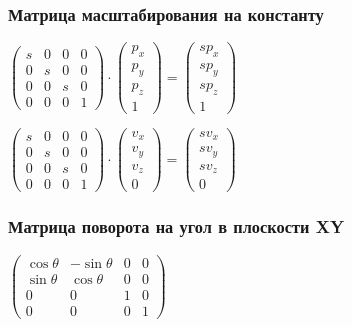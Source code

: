 \documentclass{beamer}
\begin{document}
\begin{frame}[fragile]
\frametitle{Матрица масштабирования на константу}
\begin{center}
\begin{math}
\begin{pmatrix}
s & 0 & 0 & 0 \\
0 & s & 0 & 0 \\
0 & 0 & s & 0 \\
0 & 0 & 0 & 1
\end{pmatrix}
\cdot
\begin{pmatrix}
p_x \\
p_y \\
p_z \\
1
\end{pmatrix}
=
\begin{pmatrix}
s p_x\\
s p_y\\
s p_z\\
1
\end{pmatrix}
\end{math}

\begin{math}
\begin{pmatrix}
s & 0 & 0 & 0 \\
0 & s & 0 & 0 \\
0 & 0 & s & 0 \\
0 & 0 & 0 & 1
\end{pmatrix}
\cdot
\begin{pmatrix}
v_x \\
v_y \\
v_z \\
0
\end{pmatrix}
=
\begin{pmatrix}
s v_x\\
s v_y\\
s v_z\\
0
\end{pmatrix}
\end{math}
\end{center}
\end{frame}

\begin{frame}[fragile]
\frametitle{Матрица поворота на угол в плоскости XY}
\begin{center}
\begin{math}
\begin{pmatrix}
\cos \theta & - \sin \theta & 0 & 0 \\
\sin \theta & \cos \theta & 0 & 0 \\
0 & 0 & 1 & 0 \\
0 & 0 & 0 & 1
\end{pmatrix}
\end{math}
\end{center}
\end{frame}
\end{document}
